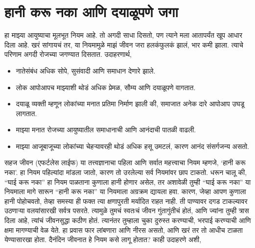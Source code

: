 \chapter{हानी करू नका आणि दयाळूपणे जगा}
हा माझ्या आयुष्याचा मूलभूत नियम आहे. तो अगदी साधा दिसतो, पण त्याने मला आतापर्यंत खूप आधार दिला आहे. खरं सांगायचं तर, या नियमामुळे माझं जीवन जरा हलकंफुलकं झालं, भार कमी झाला. त्याचे परिणाम अगदी रोजच्या जगण्यात दिसतात. उदाहरणार्थ, 
\begin{itemize}
 \item नातेसंबंध अधिक सोपे, सुसंवादी आणि समाधान देणारे झाले.
 \item लोक आपोआपच माझ्याशी थोडं अधिक प्रेमळ, सौम्य आणि दयाळूपणे वागतात.
 \item दयाळू व्यक्ती म्हणून लोकांच्या मनात प्रतिमा निर्माण झाली की, समाजात अनेक दारे आपोआप उघडू लागतात.
 \item माझ्या मनात रोजच्या आयुष्यातील समाधानाची आणि आनंदाची पातळी वाढली.
 \item माझ्या आजूबाजूच्या लोकांच्या चेहऱ्यावरही थोडं अधिक हसू उमटलं, कारण आनंद संसर्गजन्य असतो.
 \end{itemize}
सहज जीवन (एफर्टलेस लाईफ)  या तत्त्वज्ञानाचा पहिला आणि सर्वात महत्त्वाचा नियम म्हणजे,  `हानी करू नका'. हा नियम पहिल्यांदा मांडला जातो, कारण तो उरलेल्या सर्व नियमांवर छाप टाकतो. धरून चालू की, “घाई करू नका” हा नियम पाळताना कुणाला हानी होणार असेल, तर अशावेळी तुम्ही “घाई करू नका” या नियमाला मागे सारून ``हानी करू नका'' या नियमाला अग्रक्रम द्यायला हवा.
कारण, जेव्हा आपण कुणाला हानी पोहोचवतो, तेव्हा समस्या ही फक्त त्या क्षणापुरती मर्यादित राहत नाही. ती पाण्यावर दगड टाकल्यावर उठणाऱ्या वलयांसारखी सर्वत्र पसरते. त्यामुळे तुमचं स्वतःचं जीवन गुंतागुंतीचं होतं, आणि ज्यांना तुम्ही त्रास दिला आहे, त्यांचं जीवनसुद्धा कठीण होतं. त्यानंतर तुम्हाला चुका दुरुस्त करण्याची, भरपाई करण्याची आणि क्षमा मागण्याची वेळ येते. हा प्रवास फार लांबणारा आणि नीरस असतो, आणि खरं तर तो आधीच टाळता येण्यासारखा होता.
दैनंदिन जीवनात हे नियम कसे लागू होतात? काही उदाहरणे अशी, 
